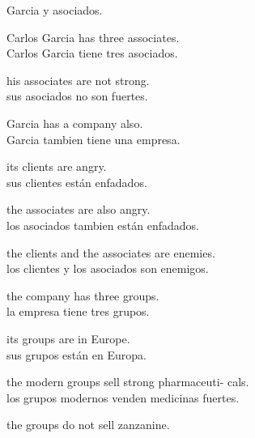 \documentclass[a4paper, 12pt]{article}
\newlength{\lineseparation}
\begin{document}
Garcia y asociados.

\hrulefill

Carlos Garcia has three associates. \\[\lineseparation]

Carlos Garcia tiene tres asociados.

\hrulefill

his associates are not strong. \\[\lineseparation]

sus asociados no son fuertes.

\hrulefill

Garcia has a company also. \\[\lineseparation]

Garcia tambien tiene una empresa.

\hrulefill

its clients are angry. \\[\lineseparation]

sus clientes est\'an enfadados.

\hrulefill

the associates are also angry. \\[\lineseparation]

los asociados tambien est\'an enfadados.

\newpage

the clients and the associates are enemies. \\[\lineseparation]

los clientes y los asociados son enemigos.

\hrulefill

the company has three groups. \\[\lineseparation]

la empresa tiene tres grupos.

\hrulefill

its groups are in Europe. \\[\lineseparation]

sus grupos est\'an en Europa.

\hrulefill

the modern groups sell strong pharmaceuti- cals. \\[\lineseparation]

los grupos modernos venden medicinas fuertes.

\hrulefill

the groups do not sell zanzanine. \\[\lineseparation]
\end{document}
